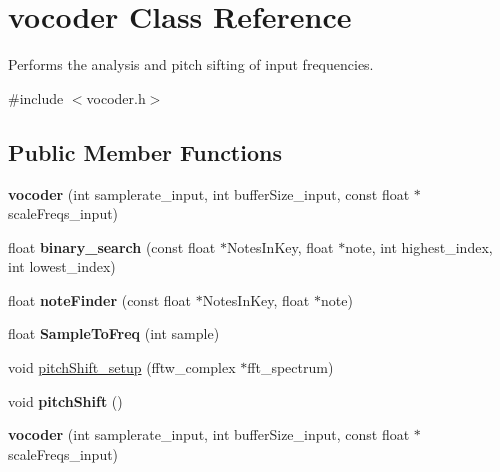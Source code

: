 \hypertarget{classvocoder}{\section{vocoder Class Reference}
\label{classvocoder}
}


Performs the analysis and pitch sifting of input frequencies.  




{\ttfamily \#include $<$vocoder.\-h$>$}

\subsection*{Public Member Functions}
\begin{DoxyCompactItemize}
\item 
\hypertarget{classvocoder_a5e51f2bff73fdb41cb326e0743170b15}{{\bfseries vocoder} (int samplerate\-\_\-input, int buffer\-Size\-\_\-input, const float $\ast$scale\-Freqs\-\_\-input)}\label{classvocoder_a5e51f2bff73fdb41cb326e0743170b15}

\item 
\hypertarget{classvocoder_a516a5e099509664b6b328a9d055adcd7}{float {\bfseries binary\-\_\-search} (const float $\ast$Notes\-In\-Key, float $\ast$note, int highest\-\_\-index, int lowest\-\_\-index)}\label{classvocoder_a516a5e099509664b6b328a9d055adcd7}

\item 
\hypertarget{classvocoder_ac1c52677bdf6c7233f667c3905539716}{float {\bfseries note\-Finder} (const float $\ast$Notes\-In\-Key, float $\ast$note)}\label{classvocoder_ac1c52677bdf6c7233f667c3905539716}

\item 
\hypertarget{classvocoder_a2b3a6e386d3a18f9366320e5743d33b1}{float {\bfseries Sample\-To\-Freq} (int sample)}\label{classvocoder_a2b3a6e386d3a18f9366320e5743d33b1}

\item 
void \hyperlink{classvocoder_aa3d122aee6d6ae77ac5b04572e924dc0}{pitch\-Shift\-\_\-setup} (fftw\-\_\-complex $\ast$fft\-\_\-spectrum)
\item 
\hypertarget{classvocoder_aa218678a51da7429066c32e59edd5057}{void {\bfseries pitch\-Shift} ()}\label{classvocoder_aa218678a51da7429066c32e59edd5057}

\item 
\hypertarget{classvocoder_a5e51f2bff73fdb41cb326e0743170b15}{{\bfseries vocoder} (int samplerate\-\_\-input, int buffer\-Size\-\_\-input, const float $\ast$scale\-Freqs\-\_\-input)}\label{classvocoder_a5e51f2bff73fdb41cb326e0743170b15}


\end{DoxyCompactItemize}
